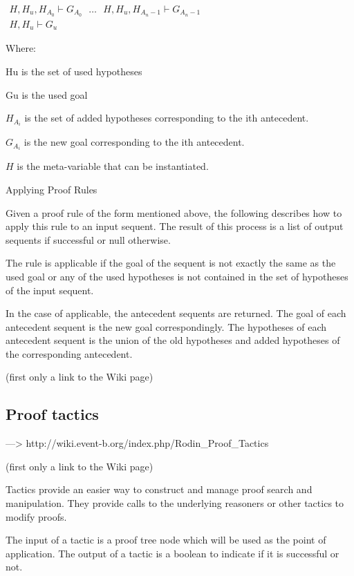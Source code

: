$\begin{array}{c} H, H_u, H_{A_0} \vdash G_{A_0} ~~~\ldots~~~ H, H_u, H_{A_n-1} \vdash G_{A_n-1} \\ \hline H, H_u \vdash G_u \end{array} $

Where:

    Hu is the set of used hypotheses 

    Gu is the used goal 

    $H_{A_i}$ is the set of added hypotheses corresponding to the ith antecedent. 

    $G_{A_i}$ is the new goal corresponding to the ith antecedent. 

    $H$ is the meta-variable that can be instantiated. 

Applying Proof Rules

Given a proof rule of the form mentioned above, the following describes how to apply this rule to an input sequent. The result of this process is a list of output sequents if successful or null otherwise.

    The rule is applicable if the goal of the sequent is not exactly the same as the used goal or any of the used hypotheses is not contained in the set of hypotheses of the input sequent. 

    In the case of applicable, the antecedent sequents are returned. The goal of each antecedent sequent is the new goal correspondingly. The hypotheses of each antecedent sequent is the union of the old hypotheses and added hypotheses of the corresponding antecedent. 

(first only a link to the Wiki page)

\subsection{Proof tactics}


---> http://wiki.event-b.org/index.php/Rodin\_Proof\_Tactics

(first only a link to the Wiki page)

Tactics provide an easier way to construct and manage proof search and manipulation. They provide calls to the underlying reasoners or other tactics to modify proofs.

The input of a tactic is a proof tree node which will be used as the point of application. The output of a tactic is a boolean to indicate if it is successful or not.

